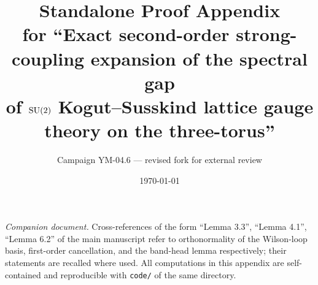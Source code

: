\documentclass[11pt]{article}
\title{\bf Standalone Proof Appendix\\
for ``Exact second-order strong-coupling expansion of the spectral gap\\
of ${\mathrm{SU}}(2)$ Kogut--Susskind lattice gauge theory on the three-torus''}
\author{Campaign YM-04.6 --- revised fork for external review}
\date{\today}
\begin{document}
\maketitle
\noindent\emph{Companion document.} Cross-references of the form ``Lemma
3.3'', ``Lemma 4.1'', ``Lemma 6.2'' of the main manuscript refer to
orthonormality of the Wilson-loop basis, first-order cancellation, and the
band-head lemma respectively; their statements are recalled where used.
All computations in this appendix are self-contained and reproducible with
\texttt{code/} of the same directory.

\end{document}

